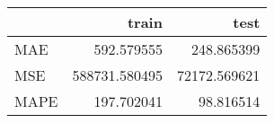 \begin{tabular}{lrr}
\toprule
{} &          train &          test \\
\midrule
MAE  &     592.579555 &    248.865399 \\
MSE  &  588731.580495 &  72172.569621 \\
MAPE &     197.702041 &     98.816514 \\
\bottomrule
\end{tabular}
